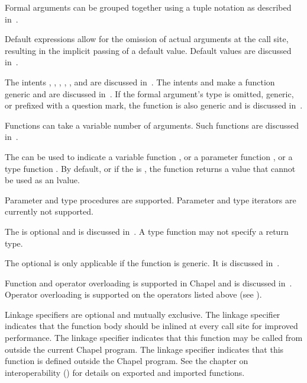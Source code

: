Formal arguments can be grouped together using a tuple notation as
described in~.

Default expressions allow for the omission of actual arguments at the
call site, resulting in the implicit passing of a default value.
Default values are discussed in~.

The intents , , , , ,  and  are discussed
in~.  The intents  and  make a
function generic and are discussed in~.  If
the formal argument's type is omitted, generic, or prefixed with a
question mark, the function is also generic and is discussed
in~.

Functions can take a variable number of arguments.  Such functions are
discussed in~.

The  can be used to indicate
a variable function ,
or a parameter function ,
or a type function .
By default, or if the  is ,
the function returns a value that cannot be used as an lvalue.

\begin{openissue}
Parameter and type procedures are supported. Parameter and type
iterators are currently not supported.
\end{openissue}

The  is optional and is discussed in~.
A type function may not specify a return type.

The optional  is only applicable if the function is
generic.  It is discussed in~.

Function and operator overloading is supported in Chapel and is
discussed in~.
Operator overloading is supported on the operators listed
above (see ).

Linkage specifiers are optional and mutually exclusive.  The linkage
specifier  indicates that the function body should be inlined at
every call site for improved performance. 
The linkage specifier  indicates that this
function may be called from outside the current Chapel program.  The linkage
specifier  indicates that this function is defined outside the
Chapel program.  See the chapter on interoperability ()
for details on exported and imported functions.


